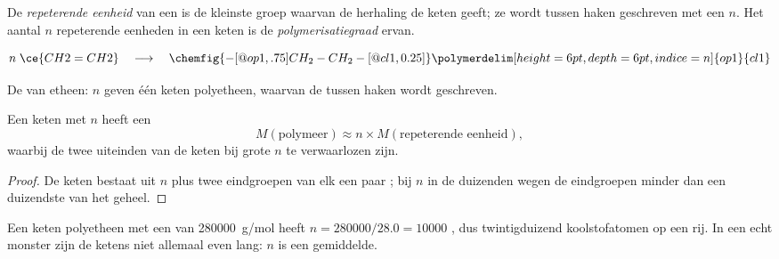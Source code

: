\begin{definition}\label{def:g12:polymers:repeat-unit}
De \emph{repeterende eenheid} van een 
is de kleinste groep  waarvan de herhaling de keten geeft; ze wordt
tussen haken geschreven met een  $n$. Het aantal $n$ repeterende
eenheden in een keten is de
\emph{polymerisatiegraad} ervan.
\end{definition}

\begin{omfigure}
\[
  n\;\ce{CH2=CH2}
  \quad\longrightarrow\quad
  \chemfig{-[@{op1,.75}]CH_2-CH_2-[@{cl1,0.25}]}
  \polymerdelim[height=6pt, depth=6pt, indice=n]{op1}{cl1}
\]

{\small De  van etheen: $n$   geven één
keten polyetheen, waarvan de   tussen
haken wordt geschreven.}
\end{omfigure}

\begin{proposition}\label{prop:g12:polymers:molar-mass}
Een keten met  $n$ heeft een 
\[
  M(\text{polymeer}) \approx n \times M(\text{repeterende eenheid}) ,
\]
waarbij de twee uiteinden van de keten bij grote $n$ te verwaarlozen zijn.
\end{proposition}

\begin{proof}
De keten bestaat uit $n$  plus twee eindgroepen van
elk een paar ; bij $n$ in de duizenden wegen de eindgroepen minder
dan een duizendste van het geheel.
\end{proof}

\begin{example}\label{ex:g12:polymers:pe}
Een keten polyetheen met een  van \qty{280000}{g/mol} heeft
$n = 280000/28.0 = 10000$ , dus twintigduizend
koolstofatomen op een rij. In een echt monster zijn de ketens niet
allemaal even lang:
$n$ is een gemiddelde.
\end{example}

